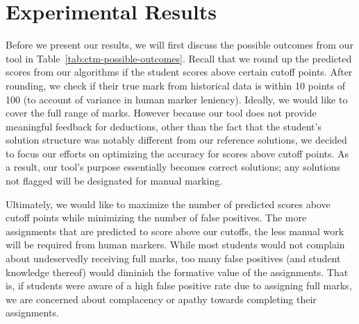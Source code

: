 \section{Experimental Results}
\label{sec:ctm-results}

Before we present our results, we will first discuss the possible outcomes from our tool in Table~\ref{tab:ctm-possible-outcomes}. Recall that we round up the predicted scores from our algorithms if the student scores above certain cutoff points. After rounding, we check if their true mark from historical data is within 10 points of 100 (to account of variance in human marker leniency). Ideally, we would like to cover the full range of marks. However because our tool does not provide meaningful feedback for deductions, other than the fact that the student's solution structure was notably different from our reference solutions, we decided to focus our efforts on optimizing the accuracy for scores above cutoff points. As a result, our tool's purpose essentially becomes  correct solutions; any solutions not flagged will be designated for manual marking.

Ultimately, we would like to maximize the number of predicted scores above cutoff points while minimizing the number of false positives. The more assignments that are predicted to score above our cutoffs, the less manual work will be required from human markers. While most students would not complain about undeservedly receiving full marks, too many false positives (and student knowledge thereof) would diminish the formative value of the assignments. That is, if students were aware of a high false positive rate due to assigning full marks, we are concerned about complacency or apathy towards completing their assignments.

